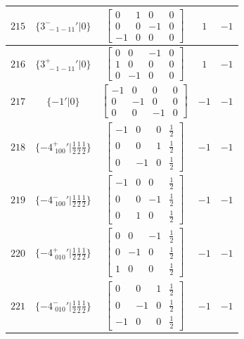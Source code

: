\documentclass[fleqn,8pt]{jsarticle}
\begin{document}
\begin{longtable}{ccccc}
$ 215 $ & $ \{3^{-}_{\,\,-1-11}{}'|0\} $ & $ \begin{bmatrix} 0 & 1 & 0 & 0 \\ 0 & 0 & -1 & 0 \\ -1 & 0 & 0 & 0 \end{bmatrix} $ & $ 1 $ & $ -1 $ \\ \hline
$ 216 $ & $ \{3^{+}_{\,\,-1-11}{}'|0\} $ & $ \begin{bmatrix} 0 & 0 & -1 & 0 \\ 1 & 0 & 0 & 0 \\ 0 & -1 & 0 & 0 \end{bmatrix} $ & $ 1 $ & $ -1 $ \\ \hline
$ 217 $ & $ \{-1{}'|0\} $ & $ \begin{bmatrix} -1 & 0 & 0 & 0 \\ 0 & -1 & 0 & 0 \\ 0 & 0 & -1 & 0 \end{bmatrix} $ & $ -1 $ & $ -1 $ \\ \hline
$ 218 $ & $ \{-4^{+}_{\,\,100}{}'|\frac{1}{2} \frac{1}{2} \frac{1}{2}\} $ & $ \begin{bmatrix} -1 & 0 & 0 & \frac{1}{2} \\ 0 & 0 & 1 & \frac{1}{2} \\ 0 & -1 & 0 & \frac{1}{2} \end{bmatrix} $ & $ -1 $ & $ -1 $ \\ \hline
$ 219 $ & $ \{-4^{-}_{\,\,100}{}'|\frac{1}{2} \frac{1}{2} \frac{1}{2}\} $ & $ \begin{bmatrix} -1 & 0 & 0 & \frac{1}{2} \\ 0 & 0 & -1 & \frac{1}{2} \\ 0 & 1 & 0 & \frac{1}{2} \end{bmatrix} $ & $ -1 $ & $ -1 $ \\ \hline
$ 220 $ & $ \{-4^{+}_{\,\,010}{}'|\frac{1}{2} \frac{1}{2} \frac{1}{2}\} $ & $ \begin{bmatrix} 0 & 0 & -1 & \frac{1}{2} \\ 0 & -1 & 0 & \frac{1}{2} \\ 1 & 0 & 0 & \frac{1}{2} \end{bmatrix} $ & $ -1 $ & $ -1 $ \\ \hline
$ 221 $ & $ \{-4^{-}_{\,\,010}{}'|\frac{1}{2} \frac{1}{2} \frac{1}{2}\} $ & $ \begin{bmatrix} 0 & 0 & 1 & \frac{1}{2} \\ 0 & -1 & 0 & \frac{1}{2} \\ -1 & 0 & 0 & \frac{1}{2} \end{bmatrix} $ & $ -1 $ & $ -1 $ \\ \hline

\end{longtable}
\end{document}
